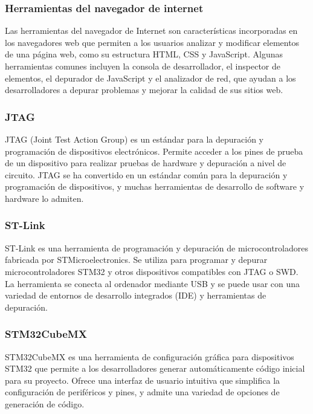 \subsubsection{Herramientas del navegador de internet}

Las herramientas del navegador de Internet son características incorporadas en los navegadores web que permiten a los usuarios analizar y modificar elementos de una página web, como su estructura HTML, CSS y JavaScript. Algunas herramientas comunes incluyen la consola de desarrollador, el inspector de elementos, el depurador de JavaScript y el analizador de red, que ayudan a los desarrolladores a depurar problemas y mejorar la calidad de sus sitios web.


\subsubsection{JTAG}

JTAG (Joint Test Action Group) \citep{jtag} es un estándar para la depuración y programación de dispositivos electrónicos. Permite acceder a los pines de prueba de un dispositivo para realizar pruebas de hardware y depuración a nivel de circuito. JTAG se ha convertido en un estándar común para la depuración y programación de dispositivos, y muchas herramientas de desarrollo de software y hardware lo admiten.


\subsubsection{ST-Link}

ST-Link \citep{st-link} es una herramienta de programación y depuración de microcontroladores fabricada por STMicroelectronics. Se utiliza para programar y depurar microcontroladores STM32 y otros dispositivos compatibles con JTAG o SWD. La herramienta se conecta al ordenador mediante USB y se puede usar con una variedad de entornos de desarrollo integrados (IDE) y herramientas de depuración. 


\subsubsection{STM32CubeMX}

STM32CubeMX \citep{stm32-cubemx} es una herramienta de configuración gráfica para dispositivos STM32 que permite a los desarrolladores generar automáticamente código inicial para su proyecto. Ofrece una interfaz de usuario intuitiva que simplifica la configuración de periféricos y pines, y admite una variedad de opciones de generación de código. 


